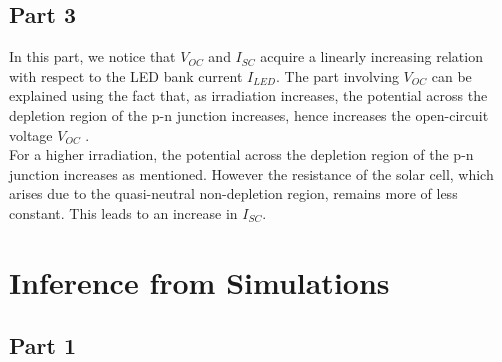 \documentclass[12pt]{article}
\begin{document}
\subsection{Part 3}

In this part, we notice that \( V_{OC} \) and \( I_{SC} \) acquire a linearly increasing relation with respect to the LED bank current \( I_{LED} \). The part involving \( V_{OC} \) can be explained using the fact that, as irradiation increases, the potential across the depletion region of the p-n junction increases, hence increases the open-circuit voltage \( V_{OC} \) .\\
For a higher irradiation, the potential across the depletion region of the p-n junction increases as mentioned. However the resistance of the solar cell, which arises due to the quasi-neutral non-depletion region, remains more of less constant. This leads to an increase in \( I_{SC} \).

\section{Inference from Simulations}

\subsection{Part 1}
\end{document}
